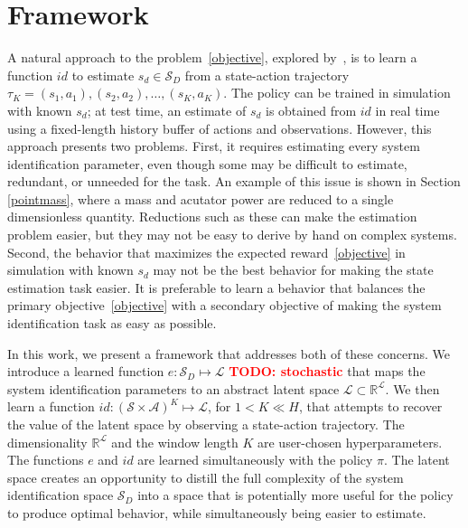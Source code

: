 \documentclass{article}
\newcommand{\R}{\mathbb{R}}
\newcommand{\TODO}[1]{\textcolor{red}{\textbf{TODO: #1}}}
\newcommand{\cA}{\mathcal{A}}
\newcommand{\cL}{\mathcal{L}}
\newcommand{\cS}{\mathcal{S}}
\newcommand{\embedfn}{e}
\newcommand{\idfn}{id}
\newcommand{\latent}{\cL}
\newcommand{\secref}[1]{Section \ref{#1}}
\begin{document}
\section{Framework}
A natural approach to the problem~\eqref{objective}, explored by~\citet{yu-up-osi-rss17},
is to learn a function $\idfn$ to estimate $s_d \in \cS_D$ from a state-action trajectory $\tau_K = (s_1, a_1), (s_2, a_2), \dots, (s_K, a_K)$.
The policy can be trained in simulation with known $s_d$;
at test time, an estimate of $s_d$ is obtained from $\idfn$ in real time using a fixed-length history buffer of actions and observations.
However, this approach presents two problems.
%
First, it requires estimating every system identification parameter,
even though some may be difficult to estimate, redundant, or unneeded for the task.
An example of this issue is shown in \secref{pointmass},
where a mass and acutator power are reduced to a single dimensionless quantity.
Reductions such as these can make the estimation problem easier, but they may not be easy to derive by hand on complex systems.
%
Second, the behavior that maximizes the expected reward~\eqref{objective}
in simulation with known $s_d$ may not be the best behavior for making the state estimation task easier.
It is preferable to learn a behavior that balances the primary objective~\eqref{objective}
with a secondary objective of making the system identification task as easy as possible.

In this work, we present a framework that addresses both of these concerns.
We introduce a learned function $\embedfn : \cS_D \mapsto \latent$
\TODO{stochastic}
that maps the system identification parameters to an abstract latent space $\latent \subset \R^\latent$.
We then learn a function $\idfn : (\cS \times \cA)^K \mapsto \latent$, for $1 < K \ll H$,
that attempts to recover the value of the latent space by observing a state-action trajectory.
The dimensionality $\R^\latent$ and the window length $K$ are user-chosen hyperparameters.
The functions $\embedfn$ and $\idfn$ are learned simultaneously with the policy $\pi$.
The latent space creates an opportunity to distill the full complexity of the system identification space $\cS_D$ into a space that is potentially more useful for the policy to produce optimal behavior,
while simultaneously being easier to estimate.
\end{document}
